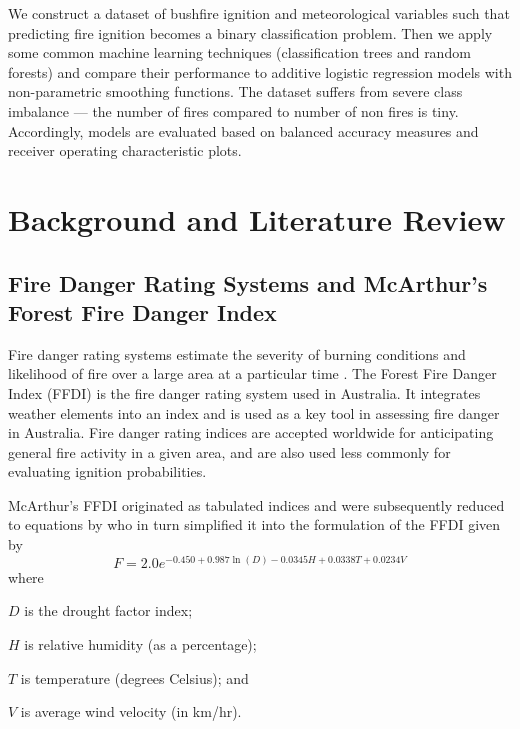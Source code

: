 \documentclass[11pt,a4paper]{article}
\begin{document}
We construct a dataset of bushfire ignition and meteorological variables such that predicting fire ignition becomes a binary classification problem. Then we apply some common machine learning techniques (classification trees and random forests) and compare their performance to additive logistic regression models with non-parametric smoothing functions. The dataset suffers from severe class imbalance --- the number of fires compared to number of non fires is tiny. Accordingly, models are evaluated based on balanced accuracy measures and receiver operating characteristic plots.



\section{Background and Literature Review}

\subsection{Fire Danger Rating Systems and McArthur's Forest Fire Danger Index}

Fire danger rating systems estimate the severity of burning conditions and likelihood of fire over a large area at a particular time \citep{chandler83, andrews03}. The Forest Fire Danger Index (FFDI) \citep{mcarthur67} is the fire danger rating system used in Australia. It integrates weather elements into an index and is used as a key tool in assessing fire danger in Australia. Fire danger rating indices are accepted worldwide for anticipating general fire activity in a given area, and are also used less commonly for evaluating ignition probabilities.

McArthur's FFDI originated as tabulated indices and were subsequently reduced to equations by \citet{noble80} who in turn simplified it into the formulation of the FFDI given by
\begin{equation}
  \label{eq FFDI}
  F=2.0 e^{-0.450 + 0.987 \ln(D)-0.0345H+0.0338T+0.0234V}
\end{equation}
where
\begin{compactitem}
  \item $D$ is the drought factor index;
  \item $H$ is relative humidity (as a percentage);
  \item $T$ is temperature (degrees Celsius); and
  \item $V$ is average wind velocity (in km/hr).
\end{compactitem}
\end{document}
